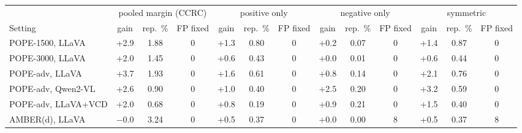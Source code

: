 \begin{tabular}{lcccccccccccc}
\toprule
 & \multicolumn{3}{c}{pooled margin (CCRC)} & \multicolumn{3}{c}{positive only} & \multicolumn{3}{c}{negative only} & \multicolumn{3}{c}{symmetric}\\
\cmidrule(lr){2-4}\cmidrule(lr){5-7}\cmidrule(lr){8-10}\cmidrule(lr){11-13}
Setting & gain & rep.\ \% & FP fixed & gain & rep.\ \% & FP fixed & gain & rep.\ \% & FP fixed & gain & rep.\ \% & FP fixed\\
\midrule
POPE-1500, LLaVA & +2.9 & 1.88 & 0 & +1.3 & 0.80 & 0 & +0.2 & 0.07 & 0 & +1.4 & 0.87 & 0\\
POPE-3000, LLaVA & +2.0 & 1.45 & 0 & +0.6 & 0.43 & 0 & +0.0 & 0.01 & 0 & +0.6 & 0.44 & 0\\
POPE-adv, LLaVA & +3.7 & 1.93 & 0 & +1.6 & 0.61 & 0 & +0.8 & 0.14 & 0 & +2.1 & 0.76 & 0\\
POPE-adv, Qwen2-VL & +2.6 & 0.90 & 0 & +1.0 & 0.40 & 0 & +2.5 & 0.20 & 0 & +3.2 & 0.59 & 0\\
POPE-adv, LLaVA+VCD & +2.0 & 0.68 & 0 & +0.8 & 0.19 & 0 & +0.9 & 0.21 & 0 & +1.5 & 0.40 & 0\\
AMBER(d), LLaVA & $-$0.0 & 3.24 & 0 & +0.5 & 0.37 & 0 & +0.0 & 0.00 & 8 & +0.5 & 0.37 & 8\\
\bottomrule
\end{tabular}
